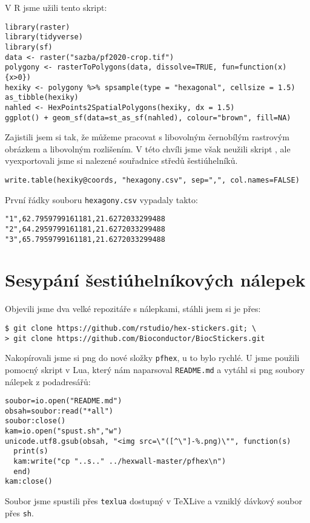 V R jsme užili tento skript:
\newpage
\begin{lstlisting}
library(raster)
library(tidyverse)
library(sf)
data <- raster("sazba/pf2020-crop.tif")
polygony <- rasterToPolygons(data, dissolve=TRUE, fun=function(x){x>0})
hexiky <- polygony %>% spsample(type = "hexagonal", cellsize = 1.5)
as_tibble(hexiky)
nahled <- HexPoints2SpatialPolygons(hexiky, dx = 1.5)
ggplot() + geom_sf(data=st_as_sf(nahled), colour="brown", fill=NA)
\end{lstlisting}

Zajistili jsem si tak, že můžeme pracovat s libovolným černobílým rastrovým obrázkem a libovolným rozlišením. V této chvíli jsme však neužili skript , ale vyexportovali jsme si nalezené souřadnice středů šestiúhelníků.

\begin{lstlisting}
write.table(hexiky@coords, "hexagony.csv", sep=",", col.names=FALSE)
\end{lstlisting}

První řádky souboru \texttt{hexagony.csv} vypadaly takto:
\begin{lstlisting}
"1",62.7959799161181,21.6272033299488 
"2",64.2959799161181,21.6272033299488 
"3",65.7959799161181,21.6272033299488 
\end{lstlisting}


\section{Sesypání šestiúhelníkových nálepek}
Objevili jsme dva velké repozitáře s nálepkami, stáhli jsem si je přes:
\begin{lstlisting}
$ git clone https://github.com/rstudio/hex-stickers.git; \
> git clone https://github.com/Bioconductor/BiocStickers.git
\end{lstlisting}

Nakopírovali jsme si png do nové složky \texttt{pfhex}, u  to bylo rychlé. U  jsme použili pomocný skript v Lua, který nám naparsoval \texttt{README.md} a vytáhl si png soubory nálepek z podadresářů:
\begin{lstlisting}
soubor=io.open("README.md")
obsah=soubor:read("*all")
soubor:close()
kam=io.open("spust.sh","w")
unicode.utf8.gsub(obsah, "<img src=\"([^\"]-%.png)\"", function(s)
  print(s)
  kam:write("cp "..s.." ../hexwall-master/pfhex\n")
  end)
kam:close()
\end{lstlisting}

Soubor jsme spustili přes \texttt{texlua} dostupný v \TeX Live a vzniklý dávkový soubor přes \texttt{sh}.

